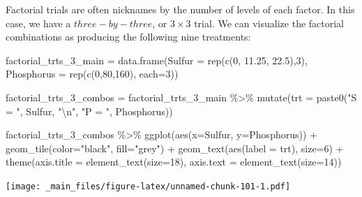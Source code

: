 \documentclass[
]{book}
\newenvironment{Shaded}{\begin{snugshade}}{\end{snugshade}}
\newcommand{\AttributeTok}[1]{\textcolor[rgb]{0.77,0.63,0.00}{#1}}
\newcommand{\DecValTok}[1]{\textcolor[rgb]{0.00,0.00,0.81}{#1}}
\newcommand{\FloatTok}[1]{\textcolor[rgb]{0.00,0.00,0.81}{#1}}
\newcommand{\FunctionTok}[1]{\textcolor[rgb]{0.00,0.00,0.00}{#1}}
\newcommand{\NormalTok}[1]{#1}
\newcommand{\OtherTok}[1]{\textcolor[rgb]{0.56,0.35,0.01}{#1}}
\newcommand{\SpecialCharTok}[1]{\textcolor[rgb]{0.00,0.00,0.00}{#1}}
\newcommand{\StringTok}[1]{\textcolor[rgb]{0.31,0.60,0.02}{#1}}
\begin{document}
Factorial trials are often nicknames by the number of levels of each factor. In this case, we have a \(three-by-three\), or \(3\times3\) trial. We can visualize the factorial combinations as producing the following nine treatments:

\begin{Shaded}
\begin{Highlighting}[]
\NormalTok{factorial\_trts\_3\_main }\OtherTok{=} \FunctionTok{data.frame}\NormalTok{(}\AttributeTok{Sulfur =} \FunctionTok{rep}\NormalTok{(}\FunctionTok{c}\NormalTok{(}\DecValTok{0}\NormalTok{, }\FloatTok{11.25}\NormalTok{, }\FloatTok{22.5}\NormalTok{),}\DecValTok{3}\NormalTok{),}
                              \AttributeTok{Phosphorus =} \FunctionTok{rep}\NormalTok{(}\FunctionTok{c}\NormalTok{(}\DecValTok{0}\NormalTok{,}\DecValTok{80}\NormalTok{,}\DecValTok{160}\NormalTok{), }\AttributeTok{each=}\DecValTok{3}\NormalTok{))}

\NormalTok{factorial\_trts\_3\_combos }\OtherTok{=}\NormalTok{ factorial\_trts\_3\_main }\SpecialCharTok{\%\textgreater{}\%}
  \FunctionTok{mutate}\NormalTok{(}\AttributeTok{trt =} \FunctionTok{paste0}\NormalTok{(}\StringTok{"S = "}\NormalTok{, Sulfur, }\StringTok{"}\SpecialCharTok{\textbackslash{}n}\StringTok{"}\NormalTok{, }\StringTok{"P = "}\NormalTok{, Phosphorus))}
                              
\NormalTok{factorial\_trts\_3\_combos }\SpecialCharTok{\%\textgreater{}\%}
  \FunctionTok{ggplot}\NormalTok{(}\FunctionTok{aes}\NormalTok{(}\AttributeTok{x=}\NormalTok{Sulfur, }\AttributeTok{y=}\NormalTok{Phosphorus)) }\SpecialCharTok{+}
  \FunctionTok{geom\_tile}\NormalTok{(}\AttributeTok{color=}\StringTok{"black"}\NormalTok{, }\AttributeTok{fill=}\StringTok{"grey"}\NormalTok{) }\SpecialCharTok{+}
  \FunctionTok{geom\_text}\NormalTok{(}\FunctionTok{aes}\NormalTok{(}\AttributeTok{label =}\NormalTok{ trt), }\AttributeTok{size=}\DecValTok{6}\NormalTok{) }\SpecialCharTok{+}
  \FunctionTok{theme}\NormalTok{(}\AttributeTok{axis.title =} \FunctionTok{element\_text}\NormalTok{(}\AttributeTok{size=}\DecValTok{18}\NormalTok{),}
        \AttributeTok{axis.text =} \FunctionTok{element\_text}\NormalTok{(}\AttributeTok{size=}\DecValTok{14}\NormalTok{))}
\end{Highlighting}
\end{Shaded}

\texttt{[image: \_main\_files/figure-latex/unnamed-chunk-101-1.pdf]}
\end{document}
